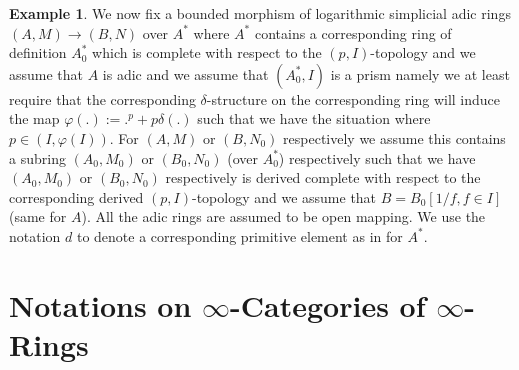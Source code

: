 \documentclass[11pt]{book}
\theoremstyle{definition}
\numberwithin{equation}{section}
\newtheorem{example}[theorem]{Example}
\begin{document}
\begin{example}
We now fix a bounded morphism of logarithmic simplicial adic rings $(A,M)\rightarrow (B,N)$ over $A^*$ where $A^*$ contains a corresponding ring of definition $A^*_0$ which is complete with respect to the $(p,I)$-topology and we assume that $A$ is adic and we assume that $(A^*_0,I)$ is a prism namely we at least require that the corresponding $\delta$-structure on the corresponding ring will induce the map $\varphi(.):=.^p+p\delta(.)$ such that we have the situation where $p\in (I,\varphi(I))$. For $(A,M)$ or $(B,N_0)$ respectively we assume this contains a subring $(A_0,M_0)$ or $(B_0,N_0)$ (over $A_0^*$) respectively such that we have $(A_0,M_0)$ or $(B_0,N_0)$ respectively is derived complete with respect to the corresponding derived $(p,I)$-topology and we assume that $B=B_0[1/f,f\in I]$ (same for $A$). All the adic rings are assumed to be open mapping. We use the notation $d$ to denote a corresponding primitive element as in \cite[Section 2.3]{12BS} for $A^*$. \\
\end{example}


\newpage

\section{Notations on $\infty$-Categories of $\infty$-Rings}
\end{document}
